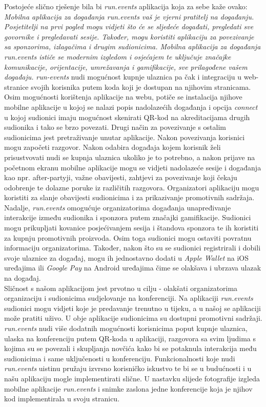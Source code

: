 		Postojeće slično rješenje bila bi \textit{run.events} aplikacija koja za sebe kaže ovako: \textit{Mobilna aplikacija za događanja run.events vaš je vjerni pratitelj na događanju. Posjetitelji na prvi pogled mogu vidjeti što će se sljedeće događati, pregledati sve govornike i pregledavati sesije. Također, mogu koristiti aplikaciju za povezivanje sa sponzorima, izlagačima i drugim sudionicima. Mobilna aplikacija za događanja run.events ističe se modernim izgledom i osjećajem te uključuje značajke komunikacije, orijentacije, umrežavanja i gamifikacije, sve prilagođene vašem događaju.}
		\textit{run-events} nudi mogućnost kupnje ulaznica pa čak i integraciju u web-stranice svojih korisnika putem koda koji je dostupan na njihovim stranicama. Osim mogućnosti korištenja aplikacije na webu, potiče se instalacija njihove mobilne aplikacije u kojoj se nalazi popis nadolazećih događanja i opcija \textit{connect} u kojoj sudionici imaju mogućnost skenirati QR-kod na akreditacijama drugih sudionika i tako se brzo povezati. Drugi način za povezivanje s ostalim sudionicima jest pretraživanje unutar aplikacije. Nakon povezivanja korisnici mogu započeti razgovor. Nakon odabira događaja kojem korisnik želi prisustvovati nudi se kupnja ulaznica ukoliko je to potrebno, a nakon prijave na početnom ekranu mobilne aplikacije mogu se vidjeti nadolazeće sesije i događanja kao npr. after-partyji, važne obavijesti, zahtjevi za povezivanje koji čekaju odobrenje te dolazne poruke iz različitih razgovora. Organizatori aplikaciju mogu koristiti za slanje obavijesti sudionicima i za prikazivanje promotivnih sadržaja. Nadalje, \textit{run.events} omogućuje organizatorima događanja unapređivanje interakcije između sudionika i sponzora putem značajki gamifikacije. Sudionici mogu prikupljati kovanice posjećivanjem sesija i štandova sponzora te ih koristiti za kupnju promotivnih proizvoda. Osim toga sudionici mogu ostaviti povratnu informaciju organizatorima. Također, nakon što su se sudionici registrirali i dobili svoje ulaznice za događaj, mogu ih jednostavno dodati u \textit{Apple Wallet} na iOS uređajima ili \textit{Google Pay} na Android uređajima čime se olakšava i ubrzava ulazak na događaj.\\
		
		Sličnost s našom aplikacijom jest prvotno u cilju - olakšati organizatorima organizaciju i sudionicima sudjelovanje na konferenciji. Na aplikaciji \textit{run.events} sudionici mogu vidjeti koje je predavanje trenutno u tijeku, a u našoj se aplikaciji može pratiti uživo. U obje aplikacije sudionicima su dostupni promotivni sadržaji. \textit{run.events} nudi više dodatnih mogućnosti korisnicima poput kupnje ulaznica, ulaska na konferenciju putem QR-koda u aplikaciji, razgovora sa svim ljudima s kojima su se povezali i skupljanja novčića kako bi se potaknula interakcija među sudionicima i same uključenosti u konferenciju. Funkcionalnosti koje nudi \textit{run.events} uistinu pružaju izvrsno korisničko iskustvo te bi se u budućnosti i u našu aplikaciju mogle implementirati slične. U nastavku slijede fotografije izgleda mobilne aplikacije \textit{run.events} i snimke zaslona jedne konferencije koja je njihov kod implementirala u svoju stranicu.\\
		
